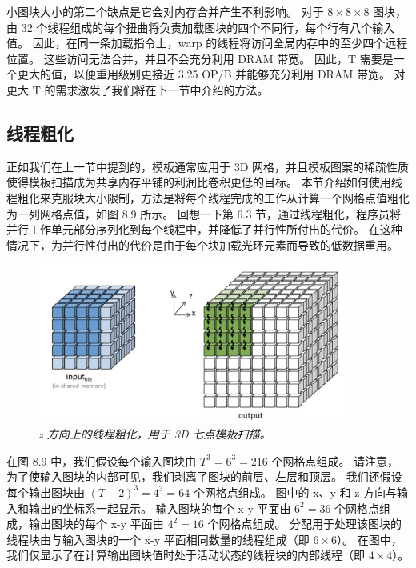 小图块大小的第二个缺点是它会对内存合并产生不利影响。 
对于 $8 \times 8 \times 8$ 图块，由 32 个线程组成的每个扭曲将负责加载图块的四个不同行，每个行有八个输入值。 
因此，在同一条加载指令上，warp 的线程将访问全局内存中的至少四个远程位置。 这些访问无法合并，并且不会充分利用 DRAM 带宽。 
因此，T 需要是一个更大的值，以便重用级别更接近 3.25 OP/B 并能够充分利用 DRAM 带宽。 
对更大 T 的需求激发了我们将在下一节中介绍的方法。

\subsection{线程粗化}
正如我们在上一节中提到的，模板通常应用于 3D 网格，并且模板图案的稀疏性质使得模板扫描成为共享内存平铺的利润比卷积更低的目标。 
本节介绍如何使用线程粗化来克服块大小限制，方法是将每个线程完成的工作从计算一个网格点值粗化为一列网格点值，如图 8.9 所示。 
回想一下第 6.3 节，通过线程粗化，程序员将并行工作单元部分序列化到每个线程中，并降低了并行性所付出的代价。 
在这种情况下，为并行性付出的代价是由于每个块加载光环元素而导致的低数据重用。

\begin{figure}[H]
	\centering
	\includegraphics[width=0.9\textwidth]{figs/F8.9.png}
	\caption{\textit{z 方向上的线程粗化，用于 3D 七点模板扫描。}}
\end{figure}

在图 8.9 中，我们假设每个输入图块由 $T^3 = 6^3 = 216$ 个网格点组成。 
请注意，为了使输入图块的内部可见，我们剥离了图块的前层、左层和顶层。 
我们还假设每个输出图块由 $(T-2)^3 = 4^3 = 64$ 个网格点组成。 图中的 x、y 和 z 方向与输入和输出的坐标系一起显示。 
输入图块的每个 x-y 平面由 $6^2 = 36$ 个网格点组成，输出图块的每个 x-y 平面由 $4^2 = 16$ 个网格点组成。 
分配用于处理该图块的线程块由与输入图块的一个 x-y 平面相同数量的线程组成（即 $6 \times 6$）。 
在图中，我们仅显示了在计算输出图块值时处于活动状态的线程块的内部线程（即 $4 \times 4$）。


